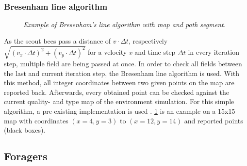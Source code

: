 	\subsubsection{Bresenham line algorithm}
		\begin{figure}\label{fig:bresenham}
			\centering
			\caption{\textit{Example of Bresenham's line algorithm with map and path segment.}}
		\end{figure}
		As the scout bees pass a distance of $v \cdot \Delta t$, respectively $\sqrt{(v_x \cdot \Delta t)^2 + (v_y \cdot \Delta t)^2}$ for a velocity $v$ and time step $\Delta t$ in every iteration step, multiple field are being passed at once. In order to check all fields between the last and current iteration step, the Bresenham line algorithm is used. With this method, all integer coordinates between two given points on the map are reported back. Afterwards, every obtained point can be checked against the current quality- and type map of the environment simulation.
		For this simple algorithm, a pre-existing implementation is used \cite{MVTB}. \ref{fig:bresenham} is an example on a 15x15 map with coordinates $(x = 4, y = 3)$ to $(x = 12, y = 14)$ and reported points (black boxes).
\subsection{Foragers}
